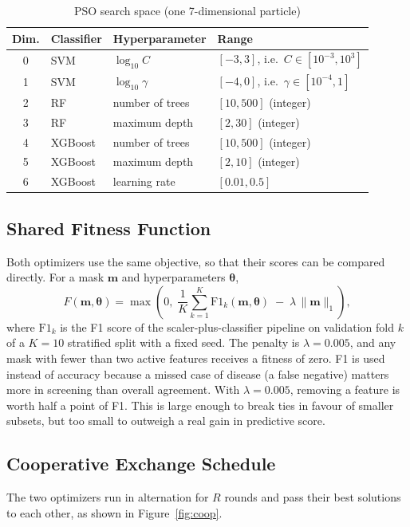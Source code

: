 \documentclass[MTech]{ugthesis}
\begin{document}
\begin{table}[htpb]
\small
\renewcommand{\arraystretch}{1.25}
\caption{PSO search space (one 7-dimensional particle)}
\label{tab:bounds}
\begin{tabular}{|c|p{2.4cm}|p{4.2cm}|p{4.4cm}|}
\hline
\textbf{Dim.} & \textbf{Classifier} & \textbf{Hyperparameter} & \textbf{Range} \\ \hline
0 & SVM & $\log_{10} C$ & $[-3, 3]$, i.e.\ $C\in[10^{-3},10^{3}]$ \\ \hline
1 & SVM & $\log_{10}\gamma$ & $[-4, 0]$, i.e.\ $\gamma\in[10^{-4},1]$ \\ \hline
2 & RF & number of trees & $[10, 500]$ (integer) \\ \hline
3 & RF & maximum depth & $[2, 30]$ (integer) \\ \hline
4 & XGBoost & number of trees & $[10, 500]$ (integer) \\ \hline
5 & XGBoost & maximum depth & $[2, 10]$ (integer) \\ \hline
6 & XGBoost & learning rate & $[0.01, 0.5]$ \\ \hline
\end{tabular}
\end{table}

\subsection{Shared Fitness Function}
Both optimizers use the same objective, so that their scores can be compared directly. For a mask $\mathbf{m}$ and hyperparameters $\boldsymbol{\theta}$,
\begin{equation}
F(\mathbf{m},\boldsymbol{\theta}) = \max\!\left(0,\; \frac{1}{K}\sum_{k=1}^{K} \mathrm{F1}_k(\mathbf{m},\boldsymbol{\theta}) \;-\; \lambda\,\|\mathbf{m}\|_1 \right),
\label{eq:fitness}
\end{equation}
where $\mathrm{F1}_k$ is the F1 score of the scaler-plus-classifier pipeline on validation fold $k$ of a $K=10$ stratified split with a fixed seed. The penalty is $\lambda = 0.005$, and any mask with fewer than two active features receives a fitness of zero. F1 is used instead of accuracy because a missed case of disease (a false negative) matters more in screening than overall agreement. With $\lambda=0.005$, removing a feature is worth half a point of F1. This is large enough to break ties in favour of smaller subsets, but too small to outweigh a real gain in predictive score.

\subsection{Cooperative Exchange Schedule}
The two optimizers run in alternation for $R$ rounds and pass their best solutions to each other, as shown in Figure~\ref{fig:coop}.
\end{document}
